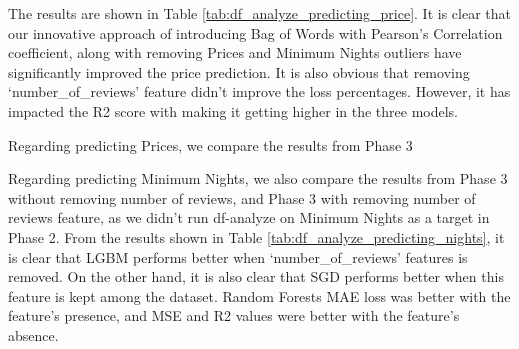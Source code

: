 \documentclass[a4paper,12pt]{article}
\begin{document}
\begin{table}[h!]
    \centering
    \caption{df-Analyze Results of Predicting Price Feature}
    \label{tab:df_analyze_predicting_price}
\end{table}

The results are shown in Table \ref{tab:df_analyze_predicting_price}. It is clear that our innovative approach of introducing Bag of Words with Pearson's Correlation coefficient, along with removing Prices and Minimum Nights outliers have significantly improved the price prediction. It is also obvious that removing `number\_of\_reviews' feature didn't improve the loss percentages. However, it has impacted the R2 score with making it getting higher in the three models.

Regarding predicting Prices, we compare the results from Phase 3

Regarding predicting Minimum Nights, we also compare the results from Phase 3 without removing number of reviews, and Phase 3 with removing number of reviews feature, as we didn't run df-analyze on Minimum Nights as a target in Phase 2. From the results shown in Table \ref{tab:df_analyze_predicting_nights}, it is clear that LGBM performs better when `number\_of\_reviews' features is removed. On the other hand, it is also clear that SGD performs better when this feature is kept among the dataset. Random Forests MAE loss was better with the feature's presence, and MSE and R2 values were better with the feature's absence.
\end{document}
